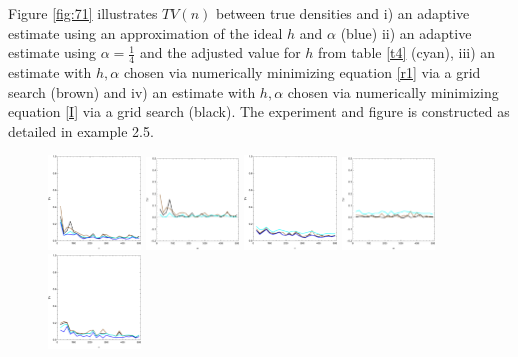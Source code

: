 \documentclass[
twoside,
openright,
titlepage,
numbers=noenddot,
headinclude,%
footinclude=true,
dottedtoc, %
ngerman,
american, %
pagesize=pdftex,
]{book}
\begin{document}
	\begin{example}
		Figure \ref{fig:71} illustrates $TV(n)$ between true densities and i) an adaptive estimate using an approximation of the ideal $h$ and $\alpha$ (blue) ii) an adaptive estimate using $\alpha=\frac{1}{4}$ and the adjusted value for $h$ from table \ref{t4} (cyan), iii) an estimate with $h,\alpha$ chosen via numerically minimizing equation \eqref{r1} via a grid search (brown) and iv) an estimate with $h,\alpha$ chosen via numerically minimizing equation \eqref{I} via a grid search (black). The experiment and figure is constructed as detailed in example 2.5.
		\begin{figure}[H]
			\centering
			\captionsetup{width=0.95\textwidth}
			\includegraphics[width=0.22\textwidth]{figures/1DTVexamples/e3n1}
			\includegraphics[width=0.22\textwidth]{figures/1DTVexamples/e3n2}
			\includegraphics[width=0.22\textwidth]{figures/1DTVexamples/e3t1}
			\includegraphics[width=0.22\textwidth]{figures/1DTVexamples/e3t2}
			\includegraphics[width=0.22\textwidth]{figures/1DTVexamples/e3l1}

\end{figure}
\end{example}
\end{document}
